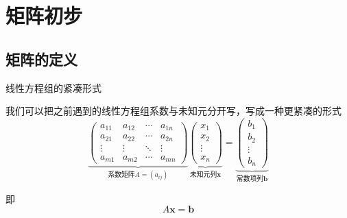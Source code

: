 
\section{矩阵初步}


\subsection{矩阵的定义}


\begin{frame}{线性方程组的紧凑形式}

我们可以把之前遇到的线性方程组系数与未知元分开写，写成一种更紧凑的形式
\[
\underbrace{\begin{pmatrix}
a_{11} & a_{12} & \cdots & a_{1n} \\
a_{21} & a_{22} & \cdots & a_{2n} \\
\vdots & \vdots & \ddots & \vdots \\
a_{m1} & a_{m2} & \cdots & a_{mn}
\end{pmatrix}}_{\text{系数矩阵} A = (a_{ij})} \underbrace{\begin{pmatrix}
x_1 \\ x_2 \\ \vdots \\ x_n
\end{pmatrix}}_{\text{未知元列}\mathbf{x}} = 
\underbrace{\begin{pmatrix}
b_1 \\ b_2 \\ \vdots \\ b_n
\end{pmatrix}}_{\text{常数项列}\mathbf{b}}
\]

\pause

即
$$A\mathbf{x} = \mathbf{b}$$

\end{frame}


